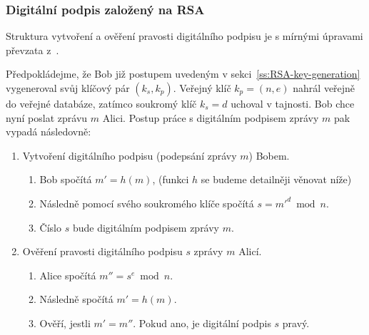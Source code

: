 \documentclass[
  program=infoi,
  biblatex=false,
  figures=true,
  glossaries,
  tables=false,
  sourcecodes=true,
  index
]{kidiplom}
\begin{document}
    \subsubsection{Digitální podpis založený na RSA}

        Struktura vytvoření a ověření pravosti digitálního podpisu je s mírnými úpravami převzata z~\cite{theory-and-practice}.

        Předpokládejme, že Bob již postupem uvedeným v sekci~\ref{ss:RSA-key-generation} vygeneroval svůj klíčový pár $(k_s,k_p)$.
        Veřejný klíč $k_p=(n, e)$ nahrál veřejně do veřejné databáze, zatímco soukromý klíč $k_s = d$ uchoval v tajnosti.
        Bob chce nyní poslat zprávu $m$ Alici.
        Postup práce s digitálním podpisem zprávy $m$ pak vypadá následovně:

        \begin{enumerate}
            \item 
                Vytvoření digitálního podpisu (podepsání zprávy $m$) Bobem.

                \begin{enumerate}[label=(\alph*)]
                    \item
                        Bob spočítá $m' = h(m)$, (funkci $h$ se budeme detailněji věnovat níže)
                    \item
                        Následně pomocí svého soukromého klíče spočítá $s = m'^d \bmod{n}$.
                    \item
                        Číslo $s$ bude digitálním podpisem zprávy $m$.
                \end{enumerate}
                
            \item
                Ověření pravosti digitálního podpisu $s$ zprávy $m$ Alicí.

                \begin{enumerate}[label=(\alph*)]
                    \item
                        Alice spočítá $m'' = s^e \bmod{n}$.
                    \item
                        Následně spočítá $m' = h(m)$.
                    \item
                        Ověří, jestli $m' = m''$. Pokud ano, je digitální podpis $s$ pravý.
                \end{enumerate}
        \end{enumerate}
\end{document}
